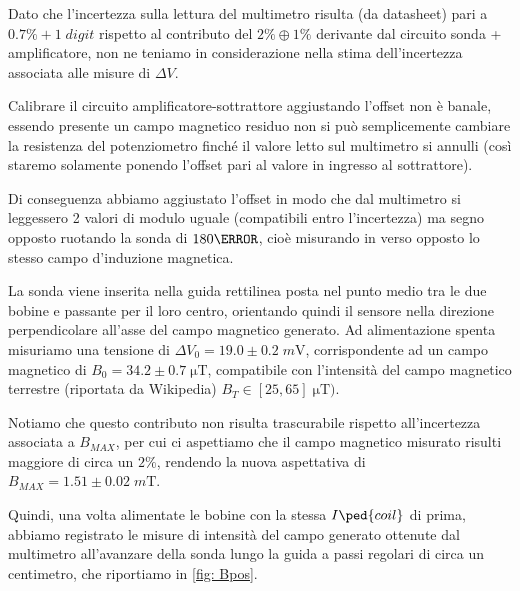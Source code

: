 \documentclass[10pt, a4paper, italian]{article}
\begin{document}
Dato che l'incertezza sulla lettura del multimetro risulta (da datasheet) pari
a $0.7 \percent + 1 \; \si{digit}$ rispetto al contributo del
$2 \percent \oplus 1 \percent$ derivante dal circuito sonda + amplificatore,
non ne teniamo in considerazione nella stima dell'incertezza associata alle
misure di $\Delta V$.

Calibrare il circuito amplificatore-sottrattore aggiustando l'offset non è
banale, essendo presente un campo magnetico residuo non si può semplicemente
cambiare la resistenza del potenziometro finché il valore letto sul multimetro
si annulli (così staremo solamente ponendo l'offset pari al valore in
ingresso al sottrattore).

Di conseguenza abbiamo aggiustato l'offset in modo che dal multimetro si
leggessero 2 valori di modulo uguale (compatibili entro l'incertezza) ma
segno opposto ruotando la sonda di $180 \degree$, cioè misurando in verso
opposto lo stesso campo d'induzione magnetica.

La sonda viene inserita nella guida rettilinea posta nel punto medio tra le
due bobine e passante per il loro centro, orientando quindi il sensore nella
direzione perpendicolare all'asse del campo magnetico generato.
Ad alimentazione spenta misuriamo una tensione di
${\Delta V}_0 = 19.0 \pm 0.2 \; \si{m\V}$, corrispondente ad un campo magnetico
di $B_0 = 34.2 \pm 0.7 \; \si{\micro \tesla}$, compatibile con l'intensità del
campo magnetico terrestre (riportata da Wikipedia) $B_T \in [25, 65] \;
\si{\micro\tesla})$.

Notiamo che questo contributo non risulta trascurabile rispetto all'incertezza
associata a $B_{MAX}$, per cui ci aspettiamo che il campo magnetico misurato
risulti maggiore di circa un $2 \percent$, rendendo la nuova aspettativa di
$B_{MAX} = 1.51 \pm 0.02 \; \si{m\tesla}$.

Quindi, una volta alimentate le bobine con la stessa $I\ped{coil}$ di prima,
abbiamo registrato le misure di intensità del campo generato ottenute dal
multimetro all'avanzare della sonda lungo la guida a passi regolari di circa
un centimetro, che riportiamo in \cref{fig: Bpos}.
\end{document}
